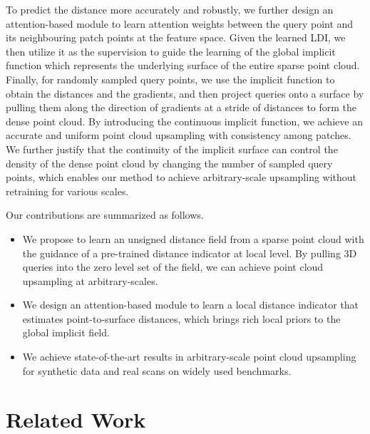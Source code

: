 \documentclass[letterpaper]{article} %
\begin{document}
To predict the distance more accurately and robustly, we further design an attention-based module to learn attention weights between the query point and its neighbouring patch points at the feature space. Given the learned LDI, we then utilize it as the supervision to guide the learning of the global implicit function which represents the underlying surface of the entire sparse point cloud. Finally, for randomly sampled query points, we use the implicit function to obtain the distances and the gradients, and then project queries onto a surface by pulling them along the direction of gradients at a stride of distances to form the dense point cloud. By introducing the continuous implicit function, we achieve an accurate and uniform point cloud upsampling with consistency among patches. We further justify that the continuity of the implicit surface can control the density of the dense point cloud by changing the number of sampled query points, which enables our method to achieve arbitrary-scale upsampling without retraining for various scales.


Our contributions are summarized as follows.
\begin{itemize}
\item We propose to learn an unsigned distance field from a sparse point cloud with the guidance of a pre-trained distance indicator at local level. By pulling 3D queries into the zero level set of the field, we can achieve point cloud upsampling at arbitrary-scales.

\item We design an attention-based module to learn a local distance indicator that estimates point-to-surface distances, which brings rich local priors to the global implicit field.

\item We achieve state-of-the-art results in arbitrary-scale point cloud upsampling for synthetic data and real scans on widely used benchmarks.

\end{itemize}

\section{Related Work}
\end{document}
